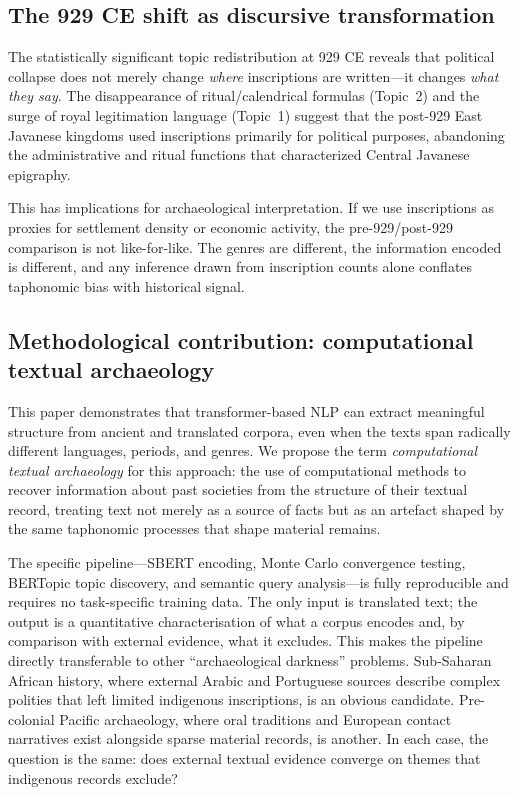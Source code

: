 \documentclass[12pt]{article}
\begin{document}
\subsection{The 929 CE shift as discursive transformation}

The statistically significant topic redistribution at 929 CE reveals that political collapse does not merely change \emph{where} inscriptions are written---it changes \emph{what they say}.
The disappearance of ritual/calendrical formulas (Topic~2) and the surge of royal legitimation language (Topic~1) suggest that the post-929 East Javanese kingdoms used inscriptions primarily for political purposes, abandoning the administrative and ritual functions that characterized Central Javanese epigraphy.

This has implications for archaeological interpretation.
If we use inscriptions as proxies for settlement density or economic activity, the pre-929/post-929 comparison is not like-for-like.
The genres are different, the information encoded is different, and any inference drawn from inscription counts alone conflates taphonomic bias with historical signal.

\subsection{Methodological contribution: computational textual archaeology}

This paper demonstrates that transformer-based NLP can extract meaningful structure from ancient and translated corpora, even when the texts span radically different languages, periods, and genres.
We propose the term \emph{computational textual archaeology} for this approach: the use of computational methods to recover information about past societies from the structure of their textual record, treating text not merely as a source of facts but as an artefact shaped by the same taphonomic processes that shape material remains.

The specific pipeline---SBERT encoding, Monte Carlo convergence testing, BERTopic topic discovery, and semantic query analysis---is fully reproducible and requires no task-specific training data.
The only input is translated text; the output is a quantitative characterisation of what a corpus encodes and, by comparison with external evidence, what it excludes.
This makes the pipeline directly transferable to other ``archaeological darkness'' problems.
Sub-Saharan African history, where external Arabic and Portuguese sources describe complex polities that left limited indigenous inscriptions, is an obvious candidate.
Pre-colonial Pacific archaeology, where oral traditions and European contact narratives exist alongside sparse material records, is another.
In each case, the question is the same: does external textual evidence converge on themes that indigenous records exclude?
\end{document}
